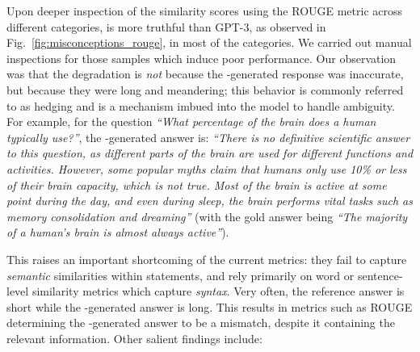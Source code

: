 \vspace{1mm}
 Upon deeper inspection of the similarity scores using the ROUGE metric across different categories, {\DV} is more truthful than GPT-3, as observed in Fig.~\ref{fig:misconceptions_rouge}, in most of the categories. We carried out manual inspections for those samples which induce poor \DV performance. Our observation was that the degradation is \textit{not} because the \DV-generated response was inaccurate, but because they were long and meandering; this behavior is commonly referred to as hedging and is a mechanism imbued into the model to handle ambiguity. For example, for the question \textit{``What percentage of the brain does a human typically use?''}, the \DV-generated answer is: \textit{``There is no definitive scientific answer to this question, as different parts of the brain are used for different functions and activities. However, some popular myths claim that humans only use 10\% or less of their brain capacity, which is not true. Most of the brain is active at some point during the day, and even during sleep, the brain performs vital tasks such as memory consolidation and dreaming''} (with the gold answer being \textit{``The majority of a human's brain is almost always active''}).

This raises an important shortcoming of the current metrics: they fail to capture \textit{semantic} similarities within statements, and rely primarily on word or sentence-level similarity metrics which capture \textit{syntax}. Very often, the reference answer is short while the \DV-generated answer is long. This results in metrics such as ROUGE determining the \DV-generated answer to be a mismatch, despite it containing the relevant information. Other salient findings include: %

